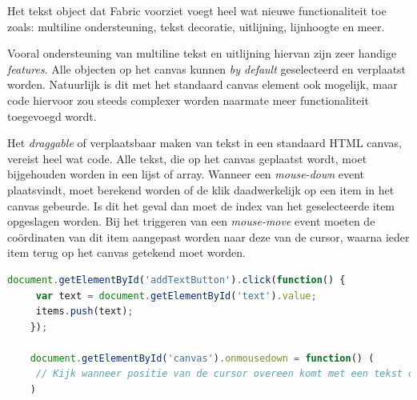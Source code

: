 Het tekst object dat Fabric voorziet voegt heel wat nieuwe functionaliteit toe zoals: multiline ondersteuning, tekst decoratie, uitlijning, lijnhoogte en meer.

Vooral ondersteuning van multiline tekst en uitlijning hiervan zijn zeer handige \textit{features}. Alle objecten op het canvas kunnen \textit{by default} geselecteerd en verplaatst worden. Natuurlijk is dit met het standaard canvas element ook mogelijk, maar code hiervoor zou steeds complexer worden naarmate meer functionaliteit toegevoegd wordt.

Het \textit{draggable} of verplaatsbaar maken van tekst in een standaard HTML canvas, vereist heel wat code. Alle tekst, die op het canvas geplaatst wordt, moet bijgehouden worden in een lijst of array. Wanneer een \textit{mouse-down} event plaatsvindt, moet berekend worden of de klik daadwerkelijk op een item in het canvas gebeurde. Is dit het geval dan moet de index van het geselecteerde item opgeslagen worden. Bij het triggeren van een \textit{mouse-move} event moeten de co\"{o}rdinaten van dit item aangepast worden naar deze van de cursor, waarna ieder item terug op het canvas getekend moet worden. 

\begin{lstlisting}[language=javascript]
	document.getElementById('addTextButton').click(function() {
	 var text = document.getElementById('text').value;
	 items.push(text);
	});
	
	document.getElementById('canvas').onmousedown = function() (
	 // Kijk wanneer positie van de cursor overeen komt met een tekst object
	)
\end{lstlisting}

